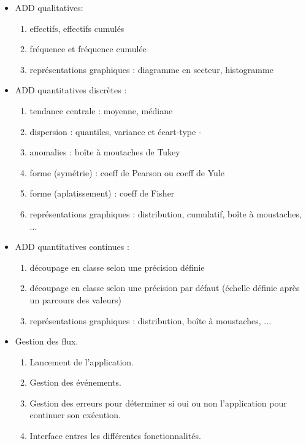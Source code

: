 \begin{itemize}
			\item ADD qualitatives:\\
					\begin{enumerate}
					\item effectifs, effectifs cumulés
					\item fréquence et fréquence cumulée
					\item représentations graphiques : diagramme en secteur, histogramme
					\end{enumerate}
			\item ADD quantitatives discrètes :\\
					\begin{enumerate}
					\item tendance centrale : moyenne, médiane
					\item dispersion : quantiles, variance et écart-type
-					\item anomalies : boîte à moutaches de Tukey
					\item forme (symétrie) : coeff de Pearson ou coeff de Yule
					\item forme (aplatissement) : coeff de Fisher
					\item représentations graphiques : distribution, cumulatif,  boîte à moustaches, ...
					\end{enumerate}
			\item ADD quantitatives continues :\\
					\begin{enumerate}
					\item découpage en classe selon une précision définie
					\item découpage en classe selon une précision par défaut (échelle définie après un parcours des valeurs)
					\item représentations graphiques : distribution, boîte à moustaches, ...
					\end{enumerate}
					
			\item Gestion des flux.
				\begin{enumerate}
				\item Lancement de l'application. 
				\item Gestion des événements.
				\item Gestion des erreurs pour déterminer si oui ou non l'application pour continuer son exécution.
				\item Interface entres les différentes fonctionnalités.
				\end{enumerate}
					

\end{itemize}
